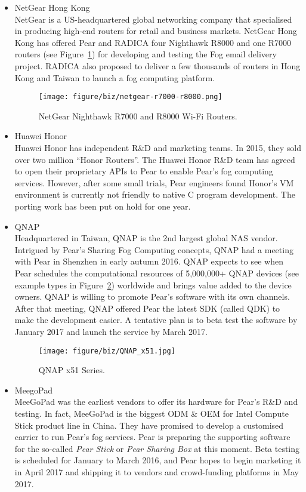 \begin{itemize}
	\item NetGear Hong Kong\\
	NetGear is a US-headquartered global networking company that specialised in producing high-end routers for retail and business markets. NetGear Hong Kong has offered Pear and RADICA four Nighthawk R8000 and one R7000 routers (see Figure~\ref{fig:netgear-r7000-r8000}) for developing and testing the Fog email delivery project. RADICA also proposed to deliver a few thousands of routers in Hong Kong and Taiwan to launch a fog computing platform. 
	\begin{figure}[ht]
		\centering
		\texttt{[image: figure/biz/netgear-r7000-r8000.png]}
		\caption{NetGear Nighthawk R7000 and R8000 Wi-Fi Routers.} \label{fig:netgear-r7000-r8000}
	\end{figure}
	\item Huawei Honor\\
	Huawei Honor has independent R\&D and marketing teams. In 2015, they sold over two million ``Honor Routers''. The Huawei Honor R\&D team has agreed to open their proprietary APIs to Pear to enable Pear's fog computing services. However, after some small trials, Pear engineers found Honor's VM environment is currently not friendly to native C program development. The porting work has been put on hold for one year. 
	\item QNAP\\
	Headquartered in Taiwan, QNAP is the 2nd largest global NAS vendor. Intrigued by Pear's Sharing Fog Computing concepts, QNAP had a meeting with Pear in Shenzhen in early autumn 2016. QNAP expects to see when Pear schedules the computational resources of 5,000,000+ QNAP devices (see example types in Figure~\ref{fig:qnap-x51}) worldwide and brings value added to the device owners. QNAP is willing to promote Pear's software with its own channels. After that meeting, QNAP offered Pear the latest SDK (called QDK) to make the development easier. A tentative plan is to beta test the software by January 2017 and launch the service by March 2017.
	\begin{figure}[ht]
		\centering
		\texttt{[image: figure/biz/QNAP\_x51.jpg]}
		\caption{QNAP x51 Series.} \label{fig:qnap-x51}
	\end{figure}
	\item MeegoPad\\
	MeeGoPad was the earliest vendors to offer its hardware for Pear's R\&D and testing. In fact, MeeGoPad is the biggest ODM \& OEM for Intel Compute Stick product line in China. They have promised to develop a customised carrier to run Pear's fog services. Pear is preparing the supporting software for the so-called \emph{Pear Stick} or \emph{Pear Sharing Box} at this moment. Beta testing is scheduled for January to March 2016, and Pear hopes to begin marketing it in April 2017 and shipping it to vendors and crowd-funding platforms in May 2017.

\end{itemize}
